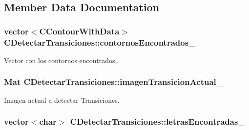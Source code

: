 \subsection{Member Data Documentation}
\subsubsection[{\texorpdfstring{contornos\+Encontrados\+\_\+}{contornosEncontrados_}}]{\setlength{\rightskip}{0pt plus 5cm}vector$<${\bf C\+Contour\+With\+Data}$>$ C\+Detectar\+Transiciones\+::contornos\+Encontrados\+\_\+\hspace{0.3cm}{\ttfamily [private]}}\hypertarget{classCDetectarTransiciones_a76910f415a085c5e73126ec3fb62a174}{}\label{classCDetectarTransiciones_a76910f415a085c5e73126ec3fb62a174}


Vector con los contornos encontrados,. 

\subsubsection[{\texorpdfstring{imagen\+Transicion\+Actual\+\_\+}{imagenTransicionActual_}}]{\setlength{\rightskip}{0pt plus 5cm}Mat C\+Detectar\+Transiciones\+::imagen\+Transicion\+Actual\+\_\+\hspace{0.3cm}{\ttfamily [private]}}\hypertarget{classCDetectarTransiciones_aa58ae70139c85dc3838338eb53a520d3}{}\label{classCDetectarTransiciones_aa58ae70139c85dc3838338eb53a520d3}


Imagen actual a detectar Transiciones. 

\subsubsection[{\texorpdfstring{letras\+Encontradas\+\_\+}{letrasEncontradas_}}]{\setlength{\rightskip}{0pt plus 5cm}vector$<$char$>$ C\+Detectar\+Transiciones\+::letras\+Encontradas\+\_\+\hspace{0.3cm}{\ttfamily [private]}}\hypertarget{classCDetectarTransiciones_a0bc5a3fc42f833f3e649e8b8c2fe573d}{}\label{classCDetectarTransiciones_a0bc5a3fc42f833f3e649e8b8c2fe573d}


